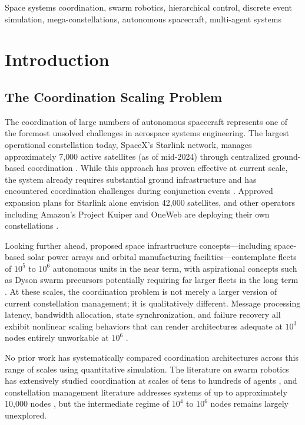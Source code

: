 \documentclass[journal]{IEEEtran}
\begin{document}
\begin{IEEEkeywords}
Space systems coordination, swarm robotics, hierarchical control, discrete event simulation, mega-constellations, autonomous spacecraft, multi-agent systems
\end{IEEEkeywords}

\section{Introduction}

\subsection{The Coordination Scaling Problem}

The coordination of large numbers of autonomous spacecraft represents one of the foremost unsolved challenges in aerospace systems engineering. The largest operational constellation today, SpaceX's Starlink network, manages approximately 7{,}000 active satellites (as of mid-2024) through centralized ground-based coordination \cite{starlink_ops}. While this approach has proven effective at current scale, the system already requires substantial ground infrastructure and has encountered coordination challenges during conjunction events \cite{esa_conjunction}. Approved expansion plans for Starlink alone envision 42{,}000 satellites, and other operators including Amazon's Project Kuiper and OneWeb are deploying their own constellations \cite{kuiper, oneweb_mgmt}.

Looking further ahead, proposed space infrastructure concepts---including space-based solar power arrays and orbital manufacturing facilities---contemplate fleets of $10^5$ to $10^6$ autonomous units in the near term, with aspirational concepts such as Dyson swarm precursors potentially requiring far larger fleets in the long term \cite{oneil_1976, badescu_2006}. At these scales, the coordination problem is not merely a larger version of current constellation management; it is qualitatively different. Message processing latency, bandwidth allocation, state synchronization, and failure recovery all exhibit nonlinear scaling behaviors that can render architectures adequate at $10^3$ nodes entirely unworkable at $10^6$ \cite{lynch_distributed}.

No prior work has systematically compared coordination architectures across this range of scales using quantitative simulation. The literature on swarm robotics has extensively studied coordination at scales of tens to hundreds of agents \cite{brambilla_2013}, and constellation management literature addresses systems of up to approximately 10{,}000 nodes \cite{wertz_smad}, but the intermediate regime of $10^4$ to $10^6$ nodes remains largely unexplored.
\end{document}
